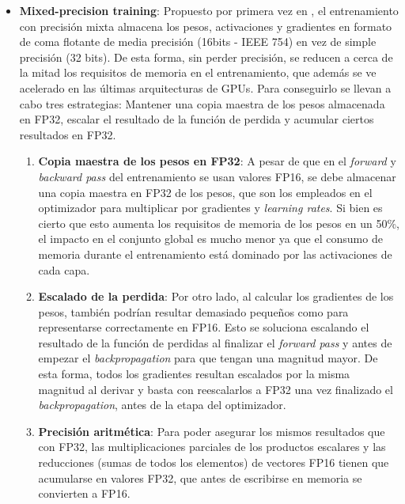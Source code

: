 \begin{itemize}
    \item \textbf{Mixed-precision training}: Propuesto por primera vez en \cite{micikevicius2018mixed}, el entrenamiento con precisión mixta almacena los pesos, activaciones y gradientes en formato de coma flotante de media precisión (16bits - IEEE 754) en vez de simple precisión (32 bits). De esta forma, sin perder precisión, se reducen a cerca de la mitad los requisitos de memoria en el entrenamiento, que además se ve acelerado en las últimas arquitecturas de GPUs. 
    Para conseguirlo se llevan a cabo tres estrategias: Mantener una copia maestra de los pesos almacenada en FP32, escalar el resultado de la función de perdida y acumular ciertos resultados en FP32.
    \begin{enumerate}
    \item \textbf{Copia maestra de los pesos en FP32}: A pesar de que en el \textit{forward} y \textit{backward pass} del entrenamiento se usan valores FP16, se debe almacenar una copia maestra en FP32 de los pesos, que son los empleados en el optimizador para multiplicar por gradientes y \textit{learning rates}. Si bien es cierto que esto aumenta los requisitos de memoria de los pesos en un 50\%, el impacto en el conjunto global es mucho menor ya que el consumo de memoria durante el entrenamiento está dominado por las activaciones de cada capa.
    \item \textbf{Escalado de la perdida}: Por otro lado, al calcular los gradientes de los pesos, también podrían resultar demasiado pequeños como para representarse correctamente en FP16. Esto se soluciona escalando el resultado de la función de perdidas al finalizar el \textit{forward pass} y antes de empezar el \textit{backpropagation} para que tengan una magnitud mayor. De esta forma, todos los gradientes resultan escalados por la misma magnitud al derivar y basta con reescalarlos a FP32 una vez finalizado el \textit{backpropagation}, antes de la etapa del optimizador.
    \item \textbf{Precisión aritmética}: Para poder asegurar los mismos resultados que con FP32, las multiplicaciones parciales de los productos escalares y las reducciones (sumas de todos los elementos) de vectores FP16 tienen que acumularse en valores FP32, que antes de escribirse en memoria se convierten a FP16.
    \end{enumerate}
\end{itemize}



